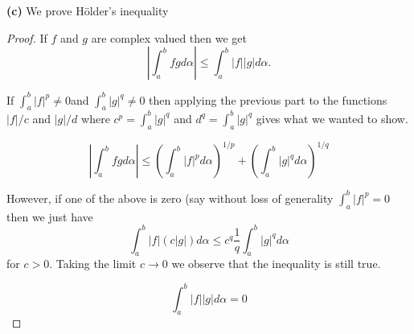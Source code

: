 \documentclass[12pt]{article}
\begin{document}
\textbf{(c)} We prove H\"older's inequality
\begin{proof}
If $f$ and $g$ are complex valued then we get 
\[\left|\int_a^b f g d\alpha \right| \leq \int_a^b |f||g| d\alpha.\]

If $\int_a^b|f|^p \neq 0$and $\int_a^b|g|^q \neq 0$ then applying the previous part to the functions $|f|/c$ and $|g|/d$ where $c^p=\int_a^b|g|^q$ and $d^q = \int_a^b|g|^q $ gives what we wanted to show.

\[\left| \int_a^b f g d \alpha  \right| \leq \left( \int_a^b |f|^p d\alpha  \right) ^{1/p}+ \left( \int_a^b |g|^q d\alpha  \right) ^{1/q}\]

However, if one of the above is zero (say without loss of generality 
$\int_a^b|f|^p =0$ then we just have 
\[\int_a^b|f|(c|g|)d\alpha \leq c^q \frac{1}{q}\int_a^b|g|^q d\alpha\]
for $c>0$. Taking the limit $c \to 0 $ we observe that the inequality is still true.

\[\int_a^b |f||g| d\alpha = 0\]

\end{proof}
\end{document}

